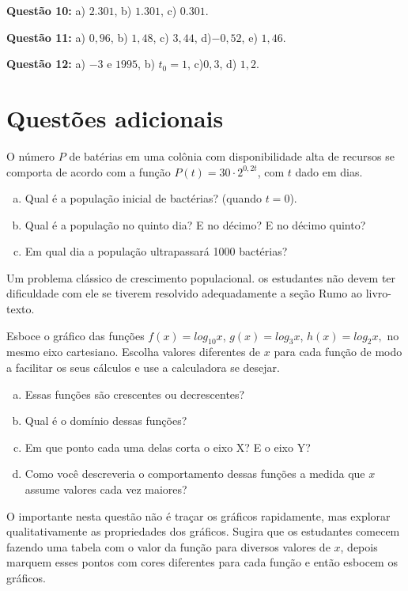 \documentclass[main_estudante.tex]{subfiles}
\begin{document}
\noindent\textbf{Questão 10:} a) $2.301$, b) $1.301$, c) $0.301$.

\noindent\textbf{Questão 11:} a) $0,96$, b) $1,48$, c) $3,44$, d)$-0,52$, e) $1,46$.

\noindent\textbf{Questão 12:} a) $-3$ e $1995$, b) $t_0=1$, c)$0,3$, d) $1,2$.

\section{Questões adicionais}

\begin{adicional}
O número $P$ de batérias em uma colônia com disponibilidade alta de recursos se comporta de acordo com a função $P(t)=30 \cdot 2^{0,2t}$, com $t$ dado em dias.
\begin{enumerate}[a)]
\item Qual é a população inicial de bactérias? (quando $t=0$).
\item Qual é a população no quinto dia? E no décimo? E no décimo quinto?
\item Em qual dia a população ultrapassará 1000 bactérias?
\end{enumerate}
\end{adicional}

Um problema clássico de crescimento populacional. os estudantes não devem ter dificuldade com ele se tiverem resolvido adequadamente a seção Rumo ao livro-texto.

\begin{adicional}
Esboce o gráfico das funções $f(x)=log_{10} x$, $g(x)=log_{3} x$, $h(x)=log_{2} x,$ no mesmo eixo cartesiano. Escolha valores diferentes de $x$ para cada função de modo a facilitar os seus cálculos e use a calculadora se desejar.
\begin{enumerate}[a)]
\item Essas funções são crescentes ou decrescentes?
\item Qual é o domínio dessas funções?
\item Em que ponto cada uma delas corta o eixo X? E o eixo Y?
\item Como você descreveria o comportamento dessas funções a medida que $x$ assume valores cada vez maiores?
\end{enumerate}
\end{adicional}

O importante nesta questão não é traçar os gráficos rapidamente, mas explorar qualitativamente as propriedades dos gráficos. Sugira que os estudantes comecem fazendo uma tabela com o valor da função para diversos valores de $x$, depois marquem esses pontos com cores diferentes para cada função e então esbocem os gráficos. 
\end{document}
